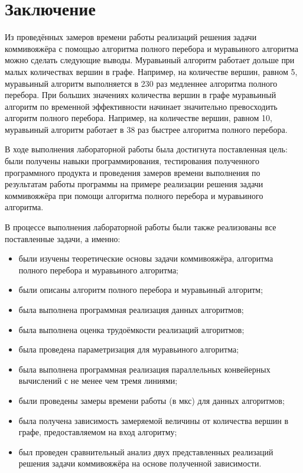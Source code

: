 \chapter*{Заключение}
Из проведённых замеров времени работы реализаций решения задачи коммивояжёра с помощью алгоритма полного перебора и муравьиного алгоритма  можно сделать следующие выводы.
Муравьиный алгоритм работает дольше при малых количествах вершин в графе. Например, на количестве вершин, равном 5, муравьиный алгоритм выполняется  в 230 раз медленнее алгоритма полного перебора. При больших значениях количества вершин в графе муравьиный алгоритм по временной эффективности начинает значительно превосходить алгоритм полного перебора. Например, на количестве вершин, равном 10, муравьиный алгоритм работает в 38 раз быстрее алгоритма полного перебора.

В ходе выполнения лабораторной работы была достигнута поставленная цель: были получены навыки программирования, тестирования полученного программного продукта и проведения замеров времени выполнения по результатам работы программы на примере реализации решения задачи коммивояжёра при помощи алгоритма полного перебора и муравьиного алгоритма.

В процессе выполнения лабораторной работы были также реализованы все поставленные задачи, а именно:
\begin{itemize}
	\item были изучены теоретические основы задачи коммивояжёра, алгоритма полного перебора и муравьиного алгоритма;
	\item были описаны алгоритм полного перебора и муравьиный алгоритм;
	\item была выполнена программная реализация данных алгоритмов;
	\item была выполнена оценка трудоёмкости реализаций алгоритмов;
	\item была проведена параметризация для муравьиного алгоритма;
	\item была выполнена программная реализация параллельных конвейерных вычислений с не менее чем тремя линиями;
	\item были проведены замеры времени работы (в мкс) для данных алгоритмов;
	\item была получена зависимость замеряемой величины от количества вершин в графе, предоставляемом на вход алгоритму;
	\item был проведен сравнительный анализ двух представленных реализаций решения задачи коммивояжёра на основе полученной зависимости.
\end{itemize}

\newpage